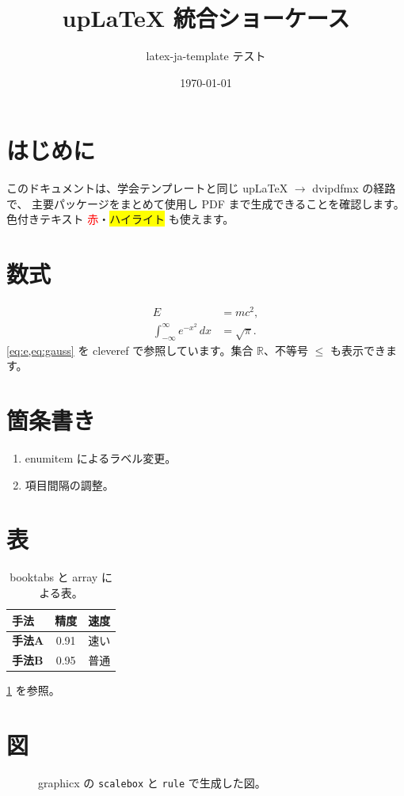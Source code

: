 \documentclass[uplatex,dvipdfmx,a4paper,11pt]{jsarticle}
\title{upLaTeX 統合ショーケース}
\author{latex-ja-template テスト}
\date{\today}
\begin{document}
\maketitle

\section{はじめに}
このドキュメントは、学会テンプレートと同じ upLaTeX $\to$ dvipdfmx の経路で、
主要パッケージをまとめて使用し PDF まで生成できることを確認します。
色付きテキスト \textcolor{red}{赤}・\colorbox{yellow}{ハイライト} も使えます。

\section{数式}
\begin{align}
  E &= mc^2, \label{eq:e} \\
  \int_{-\infty}^{\infty} e^{-x^2}\,dx &= \sqrt{\pi}. \label{eq:gauss}
\end{align}
\cref{eq:e,eq:gauss} を cleveref で参照しています。集合 $\mathbb{R}$、不等号 $\leq$ も表示できます。

\section{箇条書き}
\begin{enumerate}[label=(\arabic*), noitemsep]
  \item enumitem によるラベル変更。
  \item 項目間隔の調整。
\end{enumerate}

\section{表}
\begin{table}[h]
  \centering
  \caption{booktabs と array による表。}
  \label{tab:show}
  \begin{tabular}{>{\bfseries}l c c}
    \toprule
    手法 & 精度 & 速度 \\
    \midrule
    手法A & 0.91 & 速い \\
    手法B & 0.95 & 普通 \\
    \bottomrule
  \end{tabular}
\end{table}
\cref{tab:show} を参照。

\section{図}
\begin{figure}[h]
  \centering
  \scalebox{1.0}{\color{blue}\rule{4cm}{2cm}}
  \caption{graphicx の \texttt{scalebox} と \texttt{rule} で生成した図。}
  \label{fig:show}
\end{figure}
\end{document}
